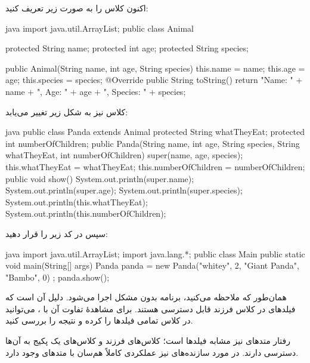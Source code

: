 اکنون کلاس  را به صورت زیر تعریف کنید:

\begin{codebox}{java}
import java.util.ArrayList;
public class Animal {
    protected String name;
    protected int age;
    protected String species;

    public Animal(String name, int age, String species) {
        this.name = name;
        this.age = age;
        this.species = species;
    }
    @Override
    public String toString() {
        return "Name: " + name + ", Age: " + age + ", Species: " + species;
    }
}
\end{codebox}

کلاس  نیز به شکل زیر تغییر می‌یابد:

\begin{codebox}{java}
public class Panda extends Animal {
    protected String whatTheyEat;
    protected int numberOfChildren;
    public Panda(String name, int age, String species, String whatTheyEat, int numberOfChildren) {
        super(name, age, species);
        this.whatTheyEat = whatTheyEat;
        this.numberOfChildren = numberOfChildren;
    }
    public void show(){
        System.out.println(super.name);
        System.out.println(super.age);
        System.out.println(super.species);
        System.out.println(this.whatTheyEat);
        System.out.println(this.numberOfChildren);
    }
}
\end{codebox}

سپس در  کد زیر را قرار دهید:

\begin{codebox}{java}
import java.util.ArrayList;  
import java.lang.*;  
public class Main {    
    public static void main(String[] args) {  
        Panda panda = new Panda("whitey", 2, "Giant Panda", "Bambo", 0) ;  
        panda.show();  
    }  
}
\end{codebox}

همان‌طور که ملاحظه می‌کنید، برنامه بدون مشکل اجرا می‌شود. دلیل آن است که
فیلدهای  در کلاس فرزند قابل دسترسی هستند. برای
مشاهدۀ تفاوت آن با ، می‌توانید در کلاس
 تمامی فیلدها را  کرده و نتیجه
را بررسی کنید.

رفتار متدهای  نیز مشابه فیلدها است؛ کلاس‌های فرزند
و کلاس‌های یک پکیج به آن‌ها دسترسی دارند. در مورد سازنده‌های
 نیز عملکردی کاملاً هم‌سان با متدهای
 وجود دارد.

